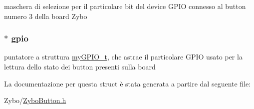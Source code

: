 maschera di selezione per il particolare bit del device G\+P\+I\+O connesso al button numero 3 della board Zybo \hypertarget{struct_zybo_button__t_ac37ddc7c58d246d233dfb38037020184}{
\subsubsection[{gpio}]{$\ast$ gpio}}\label{struct_zybo_button__t_ac37ddc7c58d246d233dfb38037020184}
puntatore a struttura \hyperlink{structmy_g_p_i_o__t}{my\+G\+P\+I\+O\+\_\+t}, che astrae il particolare G\+P\+I\+O usato per la lettura dello stato dei button presenti sulla board 

La documentazione per questa struct è stata generata a partire dal seguente file\+:\begin{DoxyCompactItemize}
\item 
Zybo/\hyperlink{_zybo_button_8h}{Zybo\+Button.\+h}\end{DoxyCompactItemize}
